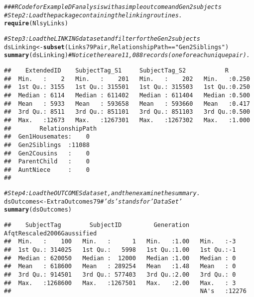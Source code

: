 \documentclass{article}\usepackage[]{graphicx}\usepackage[]{color}
\makeatletter
\newcommand{\hlstr}[1]{\textcolor[rgb]{0.192,0.494,0.8}{#1}}%
\newcommand{\hlcom}[1]{\textcolor[rgb]{0.678,0.584,0.686}{\textit{#1}}}%
\newcommand{\hlopt}[1]{\textcolor[rgb]{0,0,0}{#1}}%
\newcommand{\hlstd}[1]{\textcolor[rgb]{0.345,0.345,0.345}{#1}}%
\newcommand{\hlkwb}[1]{\textcolor[rgb]{0.69,0.353,0.396}{#1}}%
\newcommand{\hlkwd}[1]{\textcolor[rgb]{0.737,0.353,0.396}{\textbf{#1}}}%
\newenvironment{kframe}{%
 \def\at@end@of@kframe{}%
 \ifinner\ifhmode%
  \def\at@end@of@kframe{\end{minipage}}%
  \begin{minipage}{\columnwidth}%
 \fi\fi%
 \def\FrameCommand##1{\hskip\@totalleftmargin \hskip-\fboxsep
 \colorbox{shadecolor}{##1}\hskip-\fboxsep
     \hskip-\linewidth \hskip-\@totalleftmargin \hskip\columnwidth}%
 \MakeFramed {\advance\hsize-\width
   \@totalleftmargin\z@ \linewidth\hsize
   \@setminipage}}%
 {\par\unskip\endMakeFramed%
 \at@end@of@kframe}
\newenvironment{knitrout}{}{} %
\makeatother
\begin{document}
\begin{knitrout}
\color{fgcolor}\begin{kframe}
\begin{alltt}
\hlcom{### R Code for Example DF analysis with a simple outcome and Gen2 subjects}
\hlcom{#Step 2: Load the package containing the linking routines.}
\hlkwd{require}\hlstd{(NlsyLinks)}

\hlcom{#Step 3: Load the LINKING dataset and filter for the Gen2 subjects}
\hlstd{dsLinking} \hlkwb{<-} \hlkwd{subset}\hlstd{(Links79Pair, RelationshipPath}\hlopt{==}\hlstr{"Gen2Siblings"}\hlstd{)}
\hlkwd{summary}\hlstd{(dsLinking)} \hlcom{#Notice there are 11,088 records (one for each unique pair).}
\end{alltt}
\begin{verbatim}
##    ExtendedID    SubjectTag_S1     SubjectTag_S2           R        
##  Min.   :    2   Min.   :    201   Min.   :    202   Min.   :0.250  
##  1st Qu.: 3155   1st Qu.: 315501   1st Qu.: 315503   1st Qu.:0.250  
##  Median : 6114   Median : 611402   Median : 611404   Median :0.500  
##  Mean   : 5933   Mean   : 593658   Mean   : 593660   Mean   :0.417  
##  3rd Qu.: 8511   3rd Qu.: 851101   3rd Qu.: 851103   3rd Qu.:0.500  
##  Max.   :12673   Max.   :1267301   Max.   :1267302   Max.   :1.000  
##        RelationshipPath
##  Gen1Housemates:    0  
##  Gen2Siblings  :11088  
##  Gen2Cousins   :    0  
##  ParentChild   :    0  
##  AuntNiece     :    0  
## 
\end{verbatim}
\begin{alltt}
\hlcom{#Step 4: Load the OUTCOMES dataset, and then examine the summary.}
\hlstd{dsOutcomes} \hlkwb{<-} \hlstd{ExtraOutcomes79} \hlcom{#'ds' stands for 'Data Set'}
\hlkwd{summary}\hlstd{(dsOutcomes)}
\end{alltt}
\begin{verbatim}
##    SubjectTag        SubjectID         Generation   AfqtRescaled2006Gaussified
##  Min.   :    100   Min.   :      1   Min.   :1.00   Min.   :-3                
##  1st Qu.: 314025   1st Qu.:   5998   1st Qu.:1.00   1st Qu.:-1                
##  Median : 620050   Median :  12000   Median :1.00   Median : 0                
##  Mean   : 618600   Mean   : 289254   Mean   :1.48   Mean   : 0                
##  3rd Qu.: 914501   3rd Qu.: 577403   3rd Qu.:2.00   3rd Qu.: 0                
##  Max.   :1268600   Max.   :1267501   Max.   :2.00   Max.   : 3                
##                                                     NA's   :12276             

\end{verbatim}
\end{kframe}
\end{knitrout}
\end{document}
